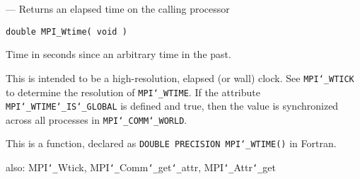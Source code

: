 \startmanpage
{}
--- Returns an elapsed time on the calling processor 
\startvb\begin{verbatim}
double MPI_Wtime( void )

\end{verbatim}
\endvb

Time in seconds since an arbitrary time in the past.
\par
{}
This is intended to be a high-resolution, elapsed (or wall) clock.
See {\tt MPI{\tt \char`\_}WTICK} to determine the resolution of {\tt MPI{\tt \char`\_}WTIME}.
If the attribute {\tt MPI{\tt \char`\_}WTIME{\tt \char`\_}IS{\tt \char`\_}GLOBAL} is defined and true, then the
value is synchronized across all processes in {\tt MPI{\tt \char`\_}COMM{\tt \char`\_}WORLD}.
\par
{}
This is a function, declared as {\tt DOUBLE PRECISION MPI{\tt \char`\_}WTIME()} in Fortran.
\par
{}
also: MPI{\tt \char`\_}Wtick, MPI{\tt \char`\_}Comm{\tt \char`\_}get{\tt \char`\_}attr, MPI{\tt \char`\_}Attr{\tt \char`\_}get
\nextline
{}
\endmanpage
